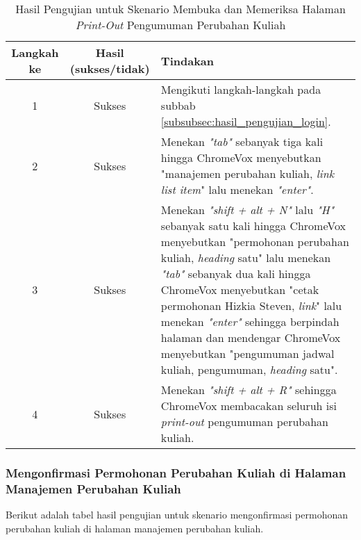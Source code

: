 \begin{table}[H]
    \centering 
    \caption{Hasil Pengujian untuk Skenario Membuka dan Memeriksa Halaman \textit{Print-Out} Pengumuman Perubahan Kuliah}
    \label{tab:hasil_pengujian_membuka_dan_memeriksa_halaman_print_out_pengumuman_perubahan_kuliah}
    \begin{tabular}{|c|c|p{10cm}|}
        \toprule
        Langkah ke & Hasil (sukses/tidak) & Tindakan \\

        \midrule
        1 & Sukses & Mengikuti langkah-langkah pada subbab \ref{subsubsec:hasil_pengujian_login}. \\
        2 & Sukses & Menekan \textit{"tab"} sebanyak tiga kali hingga ChromeVox menyebutkan "manajemen perubahan kuliah, \textit{link list item}" lalu menekan \textit{"enter"}. \\
        3 & Sukses & Menekan \textit{"shift + alt + N"} lalu \textit{"H"} sebanyak satu kali hingga ChromeVox menyebutkan "permohonan perubahan kuliah, \textit{heading} satu" lalu menekan \textit{"tab"} sebanyak dua kali hingga ChromeVox menyebutkan "cetak permohonan Hizkia Steven, \textit{link}" lalu menekan \textit{"enter"} sehingga berpindah halaman dan mendengar ChromeVox menyebutkan "pengumuman jadwal kuliah, pengumuman, \textit{heading} satu". \\
        4 & Sukses & Menekan \textit{"shift + alt + R"} sehingga ChromeVox membacakan seluruh isi \textit{print-out} pengumuman perubahan kuliah. \\ 

        \bottomrule

    \end{tabular}
\end{table}

\subsubsection{Mengonfirmasi Permohonan Perubahan Kuliah di Halaman Manajemen Perubahan Kuliah}
\label{subsubsec:hasil_pengujian_mengonfirmasi_permohonan_perubahan_kuliah_di_halaman_manajemen_perubahan_kuliah}
Berikut adalah tabel hasil pengujian untuk skenario mengonfirmasi permohonan perubahan kuliah di halaman manajemen perubahan kuliah.


